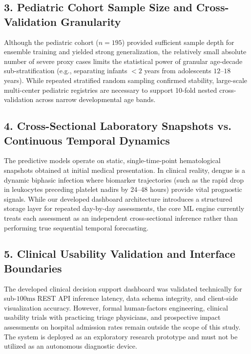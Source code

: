 \documentclass[12pt, a4paper]{report}
\begin{document}
\subsection{3. Pediatric Cohort Sample Size and Cross-Validation Granularity}
Although the pediatric cohort ($n = 195$) provided sufficient sample depth for ensemble training and yielded strong generalization, the relatively small absolute number of severe proxy cases limits the statistical power of granular age-decade sub-stratification (e.g., separating infants $< 2$ years from adolescents $12\text{--}18$ years). While repeated stratified random sampling confirmed stability, large-scale multi-center pediatric registries are necessary to support 10-fold nested cross-validation across narrow developmental age bands.

\subsection{4. Cross-Sectional Laboratory Snapshots vs. Continuous Temporal Dynamics}
The predictive models operate on static, single-time-point hematological snapshots obtained at initial medical presentation. In clinical reality, dengue is a dynamic biphasic infection where biomarker trajectories (such as the rapid drop in leukocytes preceding platelet nadirs by 24--48 hours) provide vital prognostic signals. While our developed dashboard architecture introduces a structured storage layer for repeated day-by-day assessments, the core ML engine currently treats each assessment as an independent cross-sectional inference rather than performing true sequential temporal forecasting.

\subsection{5. Clinical Usability Validation and Interface Boundaries}
The developed clinical decision support dashboard was validated technically for sub-$100\text{ms}$ REST API inference latency, data schema integrity, and client-side visualization accuracy. However, formal human-factors engineering, clinical usability trials with practicing triage physicians, and prospective impact assessments on hospital admission rates remain outside the scope of this study. The system is deployed as an exploratory research prototype and must not be utilized as an autonomous diagnostic device.

\end{document}
